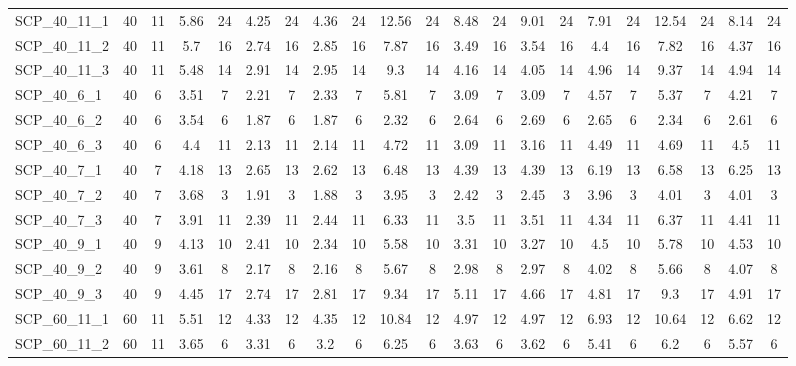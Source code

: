 \begin{sidewaystable}[!ht]
{\begin{tabular}{lcccccccccccccccccccc}
SCP\_40\_11\_1 & 40 & 11 & 5.86 & 24 &  \textcolor{blue2}{4.25} & 24 & 4.36 & 24 & 12.56 & 24 & 8.48 & 24 & 9.01 & 24 & 7.91 & 24 & 12.54 & 24 & 8.14 & 24 \\
SCP\_40\_11\_2 & 40 & 11 & 5.7 & 16 &  \textcolor{blue2}{2.74} & 16 & 2.85 & 16 & 7.87 & 16 & 3.49 & 16 & 3.54 & 16 & 4.4 & 16 & 7.82 & 16 & 4.37 & 16 \\
SCP\_40\_11\_3 & 40 & 11 & 5.48 & 14 &  \textcolor{blue2}{2.91} & 14 & 2.95 & 14 & 9.3 & 14 & 4.16 & 14 & 4.05 & 14 & 4.96 & 14 & 9.37 & 14 & 4.94 & 14 \\
SCP\_40\_6\_1 & 40 & 6 & 3.51 & 7 &  \textcolor{blue2}{2.21} & 7 & 2.33 & 7 & 5.81 & 7 & 3.09 & 7 & 3.09 & 7 & 4.57 & 7 & 5.37 & 7 & 4.21 & 7 \\
SCP\_40\_6\_2 & 40 & 6 & 3.54 & 6 &  \textcolor{blue2}{1.87} & 6 &  \textcolor{blue2}{1.87} & 6 & 2.32 & 6 & 2.64 & 6 & 2.69 & 6 & 2.65 & 6 & 2.34 & 6 & 2.61 & 6 \\
SCP\_40\_6\_3 & 40 & 6 & 4.4 & 11 &  \textcolor{blue2}{2.13} & 11 & 2.14 & 11 & 4.72 & 11 & 3.09 & 11 & 3.16 & 11 & 4.49 & 11 & 4.69 & 11 & 4.5 & 11 \\
SCP\_40\_7\_1 & 40 & 7 & 4.18 & 13 & 2.65 & 13 &  \textcolor{blue2}{2.62} & 13 & 6.48 & 13 & 4.39 & 13 & 4.39 & 13 & 6.19 & 13 & 6.58 & 13 & 6.25 & 13 \\
SCP\_40\_7\_2 & 40 & 7 & 3.68 & 3 & 1.91 & 3 &  \textcolor{blue2}{1.88} & 3 & 3.95 & 3 & 2.42 & 3 & 2.45 & 3 & 3.96 & 3 & 4.01 & 3 & 4.01 & 3 \\
SCP\_40\_7\_3 & 40 & 7 & 3.91 & 11 &  \textcolor{blue2}{2.39} & 11 & 2.44 & 11 & 6.33 & 11 & 3.5 & 11 & 3.51 & 11 & 4.34 & 11 & 6.37 & 11 & 4.41 & 11 \\
SCP\_40\_9\_1 & 40 & 9 & 4.13 & 10 & 2.41 & 10 &  \textcolor{blue2}{2.34} & 10 & 5.58 & 10 & 3.31 & 10 & 3.27 & 10 & 4.5 & 10 & 5.78 & 10 & 4.53 & 10 \\
SCP\_40\_9\_2 & 40 & 9 & 3.61 & 8 & 2.17 & 8 &  \textcolor{blue2}{2.16} & 8 & 5.67 & 8 & 2.98 & 8 & 2.97 & 8 & 4.02 & 8 & 5.66 & 8 & 4.07 & 8 \\
SCP\_40\_9\_3 & 40 & 9 & 4.45 & 17 &  \textcolor{blue2}{2.74} & 17 & 2.81 & 17 & 9.34 & 17 & 5.11 & 17 & 4.66 & 17 & 4.81 & 17 & 9.3 & 17 & 4.91 & 17 \\
SCP\_60\_11\_1 & 60 & 11 & 5.51 & 12 &  \textcolor{blue2}{4.33} & 12 & 4.35 & 12 & 10.84 & 12 & 4.97 & 12 & 4.97 & 12 & 6.93 & 12 & 10.64 & 12 & 6.62 & 12 \\
SCP\_60\_11\_2 & 60 & 11 & 3.65 & 6 & 3.31 & 6 &  \textcolor{blue2}{3.2} & 6 & 6.25 & 6 & 3.63 & 6 & 3.62 & 6 & 5.41 & 6 & 6.2 & 6 & 5.57 & 6 \\

\end{tabular}}
\end{sidewaystable}
